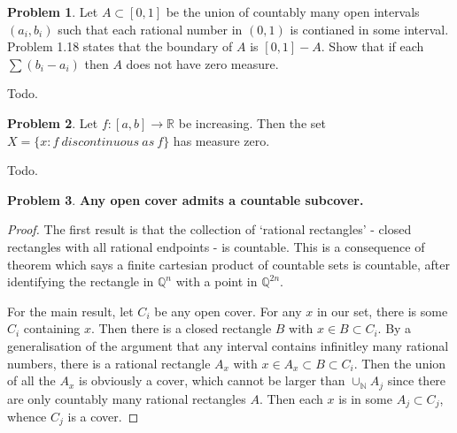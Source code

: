 \documentclass[20pt]{article}
\theoremstyle{plain}
\theoremstyle{definition}
\newtheorem*{problem}{Problem}
\newcommand{\reals}{\mathbb{R}}
\newcommand{\rationals}{\mathbb{Q}}
\newcommand{\naturals}{\mathbb{N}}
\begin{document}
\begin{problem}{3.11}
  Let $A \subset [0, 1]$ be the union of countably many open intervals $(a_i, b_i)$
  such that each rational number in $(0, 1)$ is contianed in  some interval.
  Problem 1.18 states that the boundary of $A$ is  $[0, 1] - A$.
  Show that if each $\sum (b_i - a_i)$ then $A$ does not have zero measure.
\end{problem}
\color{Blue}
Todo.
\color{Black}


\begin{problem}{3.12}
  Let $f: [a, b] \to \reals$ be increasing. Then the set 
  $X = \{ x: f\ discontinuous\ as\ f \}$ has measure zero.
\end{problem}
\color{Blue}
Todo.
\color{Black}


\begin{problem}{3.13}
	\textbf{Any open cover admits a countable subcover.}
\end{problem}

\begin{proof}
  The first result is that the collection of `rational rectangles' - closed rectangles 
  with all rational endpoints - is countable. This is a consequence of theorem which says
  a finite cartesian product of countable sets is countable, after identifying the rectangle 
  in $\rationals^n$ with a point in $\rationals^{2n}$.

  For the main result, let $C_i$ be any open cover. For any $x$ in our set, 
  there is some $C_i$ containing $x$.  Then there is a closed rectangle $B$ with
  $x \in B \subset C_i$.  By a generalisation of the argument that any interval contains 
  infinitley many rational numbers, there is a rational rectangle $A_x$ with 
  $x \in A_x \subset B \subset C_i.$
  Then the union of all the $A_x$ is obviously a cover, which cannot be larger than $\cup_\naturals A_j$ since there are only countably many rational rectangles $A$.
  Then each $x$ is in some $A_j \subset C_j$, whence $C_j$ is a cover.
\end{proof}
\end{document}
